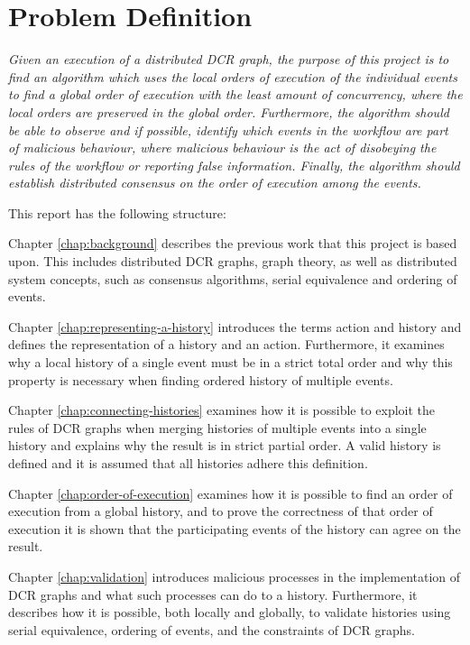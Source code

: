 \section{Problem Definition}
	\textit{Given an execution of a distributed DCR graph, the purpose of this project is to find an algorithm which uses the local orders of execution of the individual events to find a global order of execution with the least amount of concurrency, where the local orders are preserved in the global order. Furthermore, the algorithm should be able to observe and if possible, identify which events in the workflow are part of malicious behaviour, where malicious behaviour is the act of disobeying the rules of the workflow or reporting false information. Finally, the algorithm should establish distributed consensus on the order of execution among the events.}
	
	\vspace{0.4cm}
	
	\newpar
	This report has the following structure:
	
	\newpar
	Chapter \ref{chap:background} describes the previous work that this project is based upon. This includes distributed DCR graphs, graph theory, as well as distributed system concepts, such as consensus algorithms, serial equivalence and ordering of events.
		
	\newpar
	Chapter \ref{chap:representing-a-history} introduces the terms action and history and defines the representation of a history and an action.
	Furthermore, it examines why a local history of a single event must be in a strict total order and why this property is necessary when finding ordered history of multiple events. 
		
	\newpar
	Chapter \ref{chap:connecting-histories} examines how it is possible to exploit the rules of DCR graphs when merging histories of multiple events into a single history and explains why the result is in strict partial order. A valid history is defined and it is assumed that all histories adhere this definition.
	
    \newpar
    Chapter \ref{chap:order-of-execution} examines how it is possible to find an order of execution from a global history, and to prove the correctness of that order of execution it is shown that the participating events of the history can agree on the result.
		
	\newpar	Chapter \ref{chap:validation} introduces malicious processes in the implementation of DCR graphs and what such processes can do to a history. Furthermore, it describes how it is possible, both locally and globally, to validate histories using serial equivalence, ordering of events, and the constraints of DCR graphs.